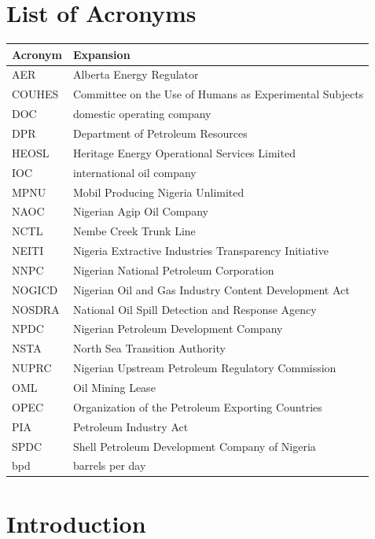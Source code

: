 \documentclass[twoside,fontset=lmodern]{mitthesis}
\begin{document}
\chapter*{List of Acronyms}
\begin{longtable}{@{}ll@{}}
\textbf{Acronym} & \textbf{Expansion}\\
\hline
AER & Alberta Energy Regulator\\
COUHES & Committee on the Use of Humans as Experimental Subjects\\
DOC & domestic operating company\\
DPR & Department of Petroleum Resources\\
HEOSL & Heritage Energy Operational Services Limited\\
IOC & international oil company\\
MPNU & Mobil Producing Nigeria Unlimited\\
NAOC & Nigerian Agip Oil Company\\
NCTL & Nembe Creek Trunk Line\\
NEITI & Nigeria Extractive Industries Transparency Initiative\\
NNPC & Nigerian National Petroleum Corporation\\
NOGICD & Nigerian Oil and Gas Industry Content Development Act\\
NOSDRA & National Oil Spill Detection and Response Agency\\
NPDC & Nigerian Petroleum Development Company\\
NSTA & North Sea Transition Authority\\
NUPRC & Nigerian Upstream Petroleum Regulatory Commission\\
OML & Oil Mining Lease\\
OPEC & Organization of the Petroleum Exporting Countries\\
PIA & Petroleum Industry Act\\
SPDC & Shell Petroleum Development Company of Nigeria\\
bpd & barrels per day\\
\end{longtable}



\hypertarget{introduction}{%
\chapter{Introduction}\label{introduction}}
\end{document}
